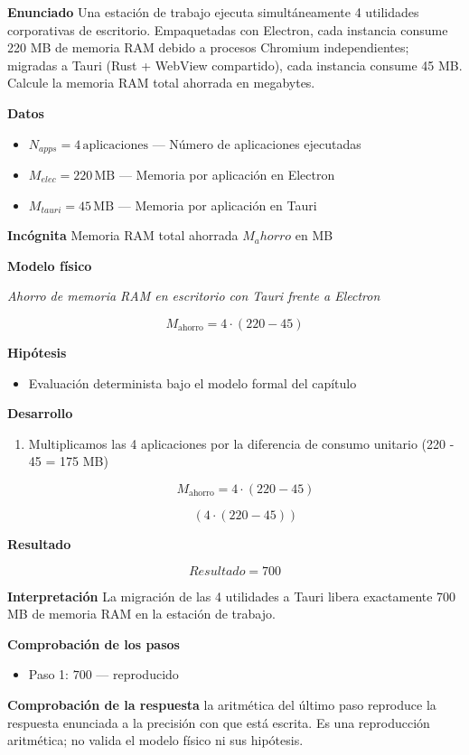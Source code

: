 \documentclass{book}
\begin{document}
\begin{tcolorbox}[title={Problema resuelto}, studiumworked, breakable]

\noindent\textbf{Enunciado}
Una estación de trabajo ejecuta simultáneamente 4 utilidades corporativas de escritorio. Empaquetadas con Electron, cada instancia consume 220 MB de memoria RAM debido a procesos Chromium independientes; migradas a Tauri (Rust + WebView compartido), cada instancia consume 45 MB. Calcule la memoria RAM total ahorrada en megabytes.

\noindent\textbf{Datos}
\begin{itemize}
\item $N_{apps} = 4\,\mathrm{aplicaciones}$ — Número de aplicaciones ejecutadas
\item $M_{elec} = 220\,\mathrm{MB}$ — Memoria por aplicación en Electron
\item $M_{tauri} = 45\,\mathrm{MB}$ — Memoria por aplicación en Tauri
\end{itemize}

\noindent\textbf{Incógnita}
Memoria RAM total ahorrada \(M_ahorro\) en MB

\noindent\textbf{Modelo físico}

\noindent\textit{Ahorro de memoria RAM en escritorio con Tauri frente a Electron}

\[
M_{\text{ahorro}} = 4 \cdot (220 - 45)
\]

\noindent\textbf{Hipótesis}
\begin{itemize}
\item Evaluación determinista bajo el modelo formal del capítulo
\end{itemize}

\noindent\textbf{Desarrollo}
\begin{enumerate}
\item
Multiplicamos las 4 aplicaciones por la diferencia de consumo unitario (220 - 45 = 175 MB)

\[
M_{\text{ahorro}} = 4 \cdot (220 - 45)
\]

\[
\left(4\cdot \left(220-45\right)\right)
\]
\end{enumerate}

\noindent\textbf{Resultado}

\[
Resultado = 700
\]

\noindent\textbf{Interpretación}
La migración de las 4 utilidades a Tauri libera exactamente 700 MB de memoria RAM en la estación de trabajo.

\noindent\textbf{Comprobación de los pasos}
\begin{itemize}
\item Paso 1: $700$ — reproducido
\end{itemize}

\noindent\textbf{Comprobación de la respuesta} la aritmética del último paso reproduce la respuesta enunciada a la precisión con que está escrita. Es una reproducción aritmética; no valida el modelo físico ni sus hipótesis.
\end{tcolorbox}
\end{document}
